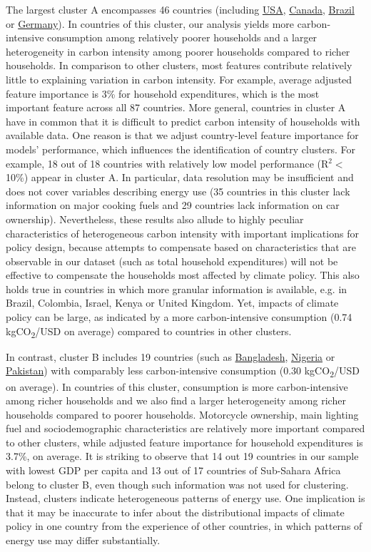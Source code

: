 \documentclass[12pt, a4paper]{article}
\begin{document}
The largest cluster A encompasses 46 countries (including \hyperref[fig:5b_USA]{USA}, \hyperref[fig:5b_CAN]{Canada}, \hyperref[fig:5b_BRA]{Brazil} or \hyperref[fig:5b_DEU]{Germany}). In countries of this cluster, our analysis yields more carbon-intensive consumption among relatively poorer households and a larger heterogeneity in carbon intensity among poorer households compared to richer households. In comparison to other clusters, most features contribute relatively little to explaining variation in carbon intensity. For example, average adjusted feature importance is 3\% for household expenditures, which is the most important feature across all 87 countries. More general, countries in cluster A have in common that it is difficult to predict carbon intensity of households with available data. One reason is that we adjust country-level feature importance for models' performance, which influences the identification of country clusters. For example, 18 out of 18 countries with relatively low model performance (R$^{2}<$10\%) appear in cluster A. In particular, data resolution may be insufficient and does not cover variables describing energy use (35 countries in this cluster lack information on major cooking fuels and 29 countries lack information on car ownership). Nevertheless, these results also allude to highly peculiar characteristics of heterogeneous carbon intensity with important implications for policy design, because attempts to compensate based on characteristics that are observable in our dataset (such as total household expenditures) will not be effective to compensate the households most affected by climate policy. This also holds true in countries in which more granular information is available, e.g. in Brazil, Colombia, Israel, Kenya or United Kingdom. Yet, impacts of climate policy can be large, as indicated by a more carbon-intensive consumption (0.74 kgCO\textsubscript{2}/USD on average) compared to countries in other clusters. 

In contrast, cluster B includes 19 countries (such as \hyperref[fig:5b_BGD]{Bangladesh}, \hyperref[fig:5b_NGA]{Nigeria} or \hyperref[fig:5b_PAK]{Pakistan}) with comparably less carbon-intensive consumption (0.30 kgCO\textsubscript{2}/USD on average). In countries of this cluster, consumption is more carbon-intensive among richer households and we also find a larger heterogeneity among richer households compared to poorer households. Motorcycle ownership, main lighting fuel and sociodemographic characteristics are relatively more important compared to other clusters, while adjusted feature importance for household expenditures is 3.7\%, on average. It is striking to observe that 14 out 19 countries in our sample with lowest GDP per capita and 13 out of 17 countries of Sub-Sahara Africa belong to cluster B, even though such information was not used for clustering. Instead, clusters indicate heterogeneous patterns of energy use. One implication is that it may be inaccurate to infer about the distributional impacts of climate policy in one country from the experience of other countries, in which patterns of energy use may differ substantially.
\end{document}
